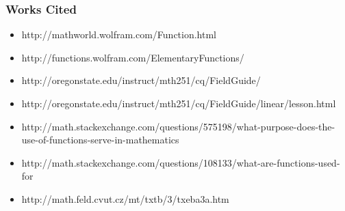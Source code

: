 \documentclass{beamer}
\begin{document}
\begin{frame}[fragile]\frametitle{Works Cited}

\begin{itemize}
  \item http://mathworld.wolfram.com/Function.html
  \item http://functions.wolfram.com/ElementaryFunctions/
  \item http://oregonstate.edu/instruct/mth251/cq/FieldGuide/
  \item http://oregonstate.edu/instruct/mth251/cq/FieldGuide/linear/lesson.html
  \item http://math.stackexchange.com/questions/575198/what-purpose-does-the-use-of-functions-serve-in-mathematics
  \item http://math.stackexchange.com/questions/108133/what-are-functions-used-for
  \item http://math.feld.cvut.cz/mt/txtb/3/txeba3a.htm
\end{itemize}

\end{frame}
\end{document}
